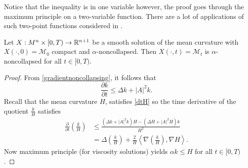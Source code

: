     \begin{remark}
        Notice that the inequality is in one variable however, the proof goes through the maximum principle on a two-variable function. There are a lot of applications of such two-point functions considered in \cite{brendle2014two,andrews2014moduli}.
    \end{remark}


\begin{corollary}
    [Noncollapsing]
    Let $ X: M^{n} \times [0,T) \to \mathbb{R}^{n+1} $ be a smooth solution of the mean curvature with $ X(\cdot, 0) = \mathcal{M}_{0} $ compact and $ \alpha $-noncollapsed. Then $ X(\cdot,t) = \mathcal{M}_{t} $ is $ \alpha $-noncollapsed for all $t \in [0,T)  $. 
\end{corollary}
\begin{proof}
    From \cref{gradientnoncollapsing}, it follows that 
    \[ \frac{\partial k}{ \partial t} \le \Delta k + |A|^{2}k.\]
    Recall that the mean curvature $ H $, satisfies \cref{dtH} so the time derivative of the quotient $ \frac{k}{H} $ satisfies \begin{align*}
        \frac{\partial }{\partial t}\left( \frac{k}{H} \right)  & \le \frac{(\Delta k+|A|^{2}k)H - (\Delta H + |A|^{2}H)k}{H^{2}} \\
        & = \Delta \left( \frac{k}{H} \right) + \frac{2}{H}\left< \nabla \left( \frac{k}{H} \right), \nabla H \right>.
    \end{align*}
    Now maximum principle (for viscosity solutions) yields $ \alpha k \le H  $ for all $ t \in [0, T) $. 
  

    
\end{proof}